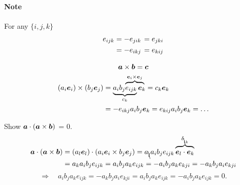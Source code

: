 \paragraph{Note} For any \(\{i, j, k\}\)
%
\begin{equation*}
  \begin{aligned}
    e_{ijk} &= -e_{jik} \hspace{-2ex}&&= e_{jki} \\
            &= -e_{ikj} \hspace{-2ex}&&= e_{kij}
  \end{aligned}
\end{equation*}

\begin{example}
  \vspace{-2ex}
  \begin{gather*}
    \mb{a} \crossprod \mb{b} = \mb{c} \\
    \begin{aligned}
    \left(a_{i} \ee_{i}\right) \crossprod \left(b_{j} \ee_{j}\right)
      &=\underbrace{a_i b_j \lefteqn{\overbrace{\vphantom{A}\phantom{e_{ijk} \ee_k}}^{\ee_i \crossprod \ee_j}} e_{ijk}}_{c_k} \ee_k = c_k \ee_k \\
      &= -e_{ikj} a_{i} b_{j} \ee_{k} = e_{kij} a_{i} b_{j} \ee_{k} = \ldots
    \end{aligned}
  \end{gather*}
\end{example}

\begin{example}
  Show \(\bm{a} \cdot (\bm{a} \mathbin{\times} \bm{b})\) = 0.
  \vspace{-3ex}
  \begin{equation*}
    \begin{aligned}
    \bm{a} \cdot (\bm{a} \mathbin{\times} \bm{b})
    &= \left(a_{l} \bm{e}_{l}\right) \cdot \left(a_{i} \bm{e}_{i} \mathbin{\times} b_{j} \bm{e}_{j}\right)
    = a_{\bcancel{l}} a_{i} b_{j} e_{ijk} \overbrace{\vphantom{A}\bm{e}_{l} \cdot \bm{e}_{k}}^{\delta_{\bcancel{l}k}} \\
    &= a_{k} a_{i} b_{j} e_{ijk} = a_{i} b_{j} a_{k} e_{ijk} = - a_{i} b_{j} a_{k} e_{kji} = - a_{k} b_{j} a_{i} e_{kji} \\
    \end{aligned}
  \end{equation*}
  \begin{equation*}
      \Rightarrow \quad a_{i} b_{j} a_{k} e_{ijk} = - a_{k} b_{j} a_{i} e_{kji} =
      a_{i} b_{j} a_{k} e_{ijk} = - a_{i} b_{j} a_{k} e_{ijk} = 0.
  \end{equation*}
\end{example}

